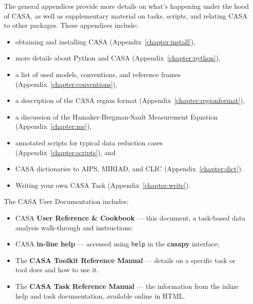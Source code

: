 The general appendices provide more details on what's happening
under the hood of CASA, as well as supplementary material on tasks,
scripts, and relating CASA to other packages.  These appendices
include:
\begin{itemize}
   \item obtaining and installing CASA 
         (Appendix~\ref{chapter:install}),

   \item more details about Python and CASA 
         (Appendix~\ref{chapter:python}),

   \item a list of used models, conventions, and reference frames 
             (Appendix~\ref{chapter:conventions}),

   \item a description of the CASA region format
            (Appendix~\ref{chapter:regionformat}),

   \item a discussion of the Hamaker-Bregman-Sault Measurement Equation
         (Appendix~\ref{chapter:me}),


   \item annotated scripts for typical data reduction cases 
         (Appendix~\ref{chapter:scripts}), and

   \item CASA dictionaries to AIPS, MIRIAD, and CLIC
         (Appendix~\ref{chapter:dict}).

   \item Writing your own CASA Task
         (Appendix~\ref{chapter:write}).
\end{itemize}

The CASA User Documentation includes:
\begin{itemize}
   \item CASA {\bf User Reference \& Cookbook} --- this
     document, a task-based data analysis walk-through and instructions;
   \item CASA {\bf in-line help} --- accessed using {\tt help} in the 
              {\bf casapy} interface;
   \item The {\bf CASA Toolkit Reference Manual} --- 
         details on a specific task or tool does and how to use it.
   \item The {\bf CASA Task Reference Manual} --- 
         the information from the inline help and task documentation,
         available online in HTML.
\end{itemize}

